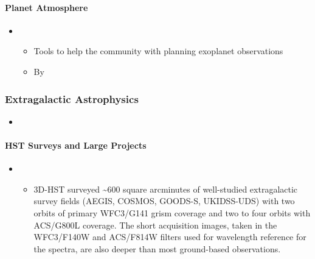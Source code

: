 \documentclass[letterpaper,10pt,english]{sphinxmanual}
\begin{document}
\paragraph{Planet Atmosphere}
\label{\detokenize{resource/astro/topics/exoplanet:planet-atmosphere}}\begin{itemize}
\item {} 
\begin{itemize}
\item {} 
Tools to help the community with planning exoplanet observations

\item {} 
By 

\end{itemize}

\end{itemize}


\subsubsection{Extragalactic Astrophysics}
\label{\detokenize{resource/astro/topics/extragalactic_astronomy:extragalactic-astrophysics}}\label{\detokenize{resource/astro/topics/extragalactic_astronomy::doc}}\begin{itemize}
\item {} 

\end{itemize}


\paragraph{HST Surveys and Large Projects}
\label{\detokenize{resource/astro/topics/extragalactic_astronomy:hst-surveys-and-large-projects}}\begin{itemize}
\item {} 
\begin{itemize}
\item {} 
3D-HST surveyed \textasciitilde{}600 square arcminutes of well-studied
extragalactic survey fields (AEGIS, COSMOS, GOODS-S, UKIDSS-UDS)
with two orbits of primary WFC3/G141 grism coverage and two to
four orbits with ACS/G800L coverage. The short acquisition images,
taken in the WFC3/F140W and ACS/F814W filters used for wavelength
reference for the spectra, are also deeper than most ground-based
observations.

\end{itemize}

\end{itemize}
\end{document}
